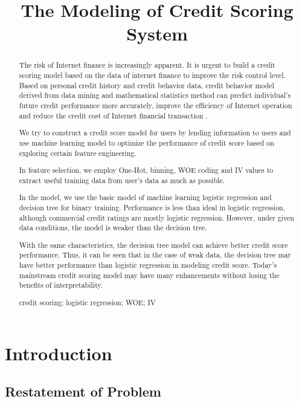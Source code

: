 \documentclass{mcmthesis}
\title{The Modeling of Credit Scoring System }
\begin{document}
\begin{abstract}
  
The risk of Internet finance is increasingly apparent. 
It is urgent to build a credit scoring model based on the data of internet finance to improve the risk control level. Based on personal credit history and credit behavior data, credit behavior model derived from data mining and mathematical statistics method can predict individual's future credit performance more accurately, improve the efficiency of Internet operation and reduce the credit cost of Internet financial transaction .

We try to construct a credit score model for users by lending information to users and use machine learning model to optimize the performance of credit score based on exploring certain feature engineering.

In feature selection, we employ One-Hot, binning, WOE coding and IV values ​​to extract useful training data from user's data as much as possible.

In the model, we use the basic model of machine learning logistic regression and decision tree for binary training. Performance is less than ideal in logistic regression, although commercial credit ratings are mostly logistic regression. However, under given data conditions, the model is weaker than the decision tree.

With the same characteristics, the decision tree model can achieve better credit score performance. Thus, it can be seen that in the case of weak data, the decision tree may have better performance than logistic regression in modeling credit score. Today's mainstream credit scoring model may have many enhancements without losing the benefits of interpretability.
\begin{keywords}
credit scoring; logistic regression; WOE; IV
\end{keywords}
\end{abstract}
\maketitle
\tableofcontents
\newpage
\section{Introduction}
\subsection{Restatement of Problem}
\end{document}
